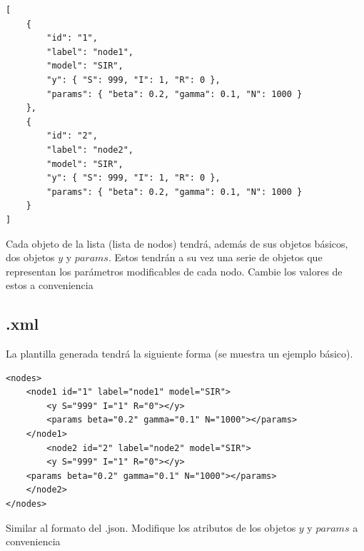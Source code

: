 \documentclass[a4paper,12pt]{article}
\begin{document}
\begin{lstlisting}
[
	{
		"id": "1",
		"label": "node1",
		"model": "SIR",
		"y": { "S": 999, "I": 1, "R": 0 },
		"params": { "beta": 0.2, "gamma": 0.1, "N": 1000 }
	},
	{
		"id": "2",
		"label": "node2",
		"model": "SIR",
		"y": { "S": 999, "I": 1, "R": 0 },
		"params": { "beta": 0.2, "gamma": 0.1, "N": 1000 }
	}
]
\end{lstlisting}
Cada objeto de la lista (lista de nodos) tendrá, además de sus objetos básicos, dos objetos $y$ y $params$. Estos tendrán a su vez una serie de objetos que representan los parámetros modificables de cada nodo. Cambie los valores de estos a conveniencia

\subsection*{.xml}
La plantilla generada tendrá la siguiente forma (se muestra un ejemplo básico).
\begin{lstlisting}
<nodes>
	<node1 id="1" label="node1" model="SIR">
		<y S="999" I="1" R="0"></y>
		<params beta="0.2" gamma="0.1" N="1000"></params>
	</node1>
		<node2 id="2" label="node2" model="SIR">
		<y S="999" I="1" R="0"></y>
	<params beta="0.2" gamma="0.1" N="1000"></params>
	</node2>
</nodes>
\end{lstlisting}
Similar al formato del .json. Modifique los atributos de los objetos $y$ y $params$ a conveniencia
\end{document}
